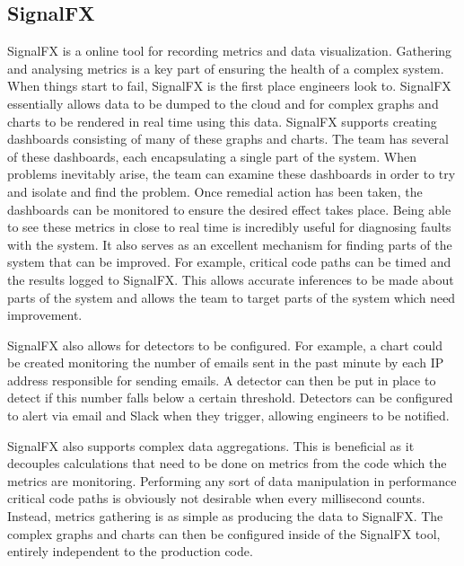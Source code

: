 \subsection{SignalFX}
SignalFX \cite{sigfx} is a online tool for recording metrics and data visualization. Gathering and analysing metrics is a key part of ensuring the health of a complex system. When things start to fail, SignalFX is the first place engineers look to. SignalFX essentially allows data to be dumped to the cloud and for complex graphs and charts to be rendered in real time using this data. SignalFX supports creating dashboards consisting of many of these graphs and charts. The \team{} team has several of these dashboards, each encapsulating a single part of the system. When problems inevitably arise, the team can examine these dashboards in order to try and isolate and find the problem. Once remedial action has been taken, the dashboards can be monitored to ensure the desired effect takes place. Being able to see these metrics in close to real time is incredibly useful for diagnosing faults with the system. It also serves as an excellent mechanism for finding parts of the system that can be improved. For example, critical code paths can be timed and the results logged to SignalFX. This allows accurate inferences to be made about parts of the system and allows the team to target parts of the system which need improvement.

SignalFX also allows for detectors to be configured. For example, a chart could be created monitoring the number of emails sent in the past minute by each IP address responsible for sending emails. A detector can then be put in place to detect if this number falls below a certain threshold. Detectors can be configured to alert via email and Slack when they trigger, allowing engineers to be notified. 

SignalFX also supports complex data aggregations. This is beneficial as it decouples calculations that need to be done on metrics from the code which the metrics are monitoring. Performing any sort of data manipulation in performance critical code paths is obviously not desirable when every millisecond counts. Instead, metrics gathering is as simple as producing the data to SignalFX. The complex graphs and charts can then be configured inside of the SignalFX tool, entirely independent to the production code. 